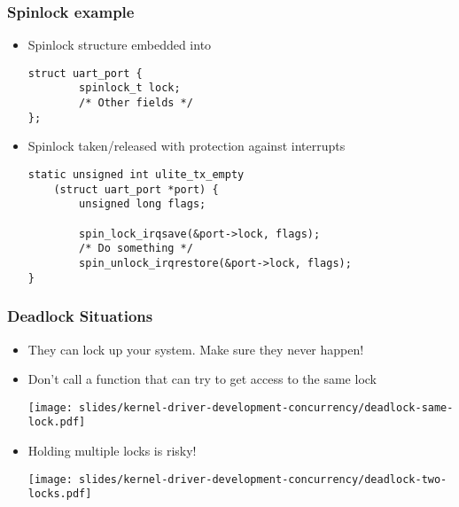 \begin{frame}[fragile]
  \frametitle{Spinlock example}
  \begin{itemize}
  \item Spinlock structure embedded into 
    \begin{verbatim}
struct uart_port {
        spinlock_t lock;
        /* Other fields */
};
    \end{verbatim}
  \item Spinlock taken/released with protection against interrupts
    \begin{verbatim}
static unsigned int ulite_tx_empty
    (struct uart_port *port) {
        unsigned long flags;

        spin_lock_irqsave(&port->lock, flags);
        /* Do something */
        spin_unlock_irqrestore(&port->lock, flags);
}
    \end{verbatim}
  \end{itemize}
\end{frame}

\begin{frame}
  \frametitle{Deadlock Situations}
  \begin{itemize}
  \item They can lock up your system. Make sure they never happen!
  \item Don't call a function that can try to get access to the same
    lock
    \begin{center}
      \texttt{[image: slides/kernel-driver-development-concurrency/deadlock-same-lock.pdf]}
    \end{center}
  \item Holding multiple locks is risky!
    \begin{center}
      \texttt{[image: slides/kernel-driver-development-concurrency/deadlock-two-locks.pdf]}
    \end{center}
  \end{itemize}
\end{frame}

